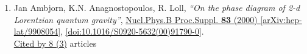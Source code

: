 \documentclass[a4paper,10pt]{article}
\begin{document}
\begin{enumerate}
\begin{enumerate}
\end{enumerate}
\item Jan Ambjorn, K.N. Anagnostopoulos, R. Loll, {\it ``On the phase diagram of 2-d Lorentzian quantum gravity''}, \href{https://www.doi.org/10.1016/S0920-5632(00)91790-0}{Nucl.Phys.B Proc.Suppl. {\bf 83} (2000) } \href{https://arxiv.org/abs/hep-lat/9908054}{[arXiv:hep-lat/9908054]}, \href{https://www.doi.org/10.1016/S0920-5632(00)91790-0}{[doi:10.1016/S0920-5632(00)91790-0]}.
\\\href{https://inspirehep.net/literature/?q=refersto%3Arecid%3A506246}{Cited by 8 (3)} articles


\end{enumerate}
\end{document}
